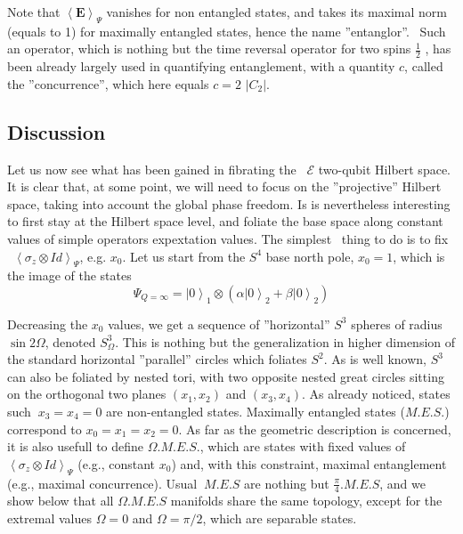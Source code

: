 \documentclass{amsart}
\begin{document}
Note that $\left\langle \mathbf{E}\right\rangle _{\Psi}$ vanishes for non
entangled states, and takes its maximal norm (equals to 1) for maximally
entangled states, hence the name ''entanglor''. \ Such an operator, which is
nothing but the time reversal operator for two spins
${\frac12}$%
, has been already largely used in quantifying entanglement\cite{wootters},
with a quantity $c$, called the ''concurrence'', which here equals $c=2$
$\left|  C_{2}\right|  $.

\subsection{Discussion}

Let us now see what has been gained in fibrating the \ $\mathcal{E}$ two-qubit
Hilbert space. It is clear that, at some point, we will need to focus on the
''projective'' Hilbert space, taking into account the global phase freedom. Is
is nevertheless interesting to first stay at the Hilbert space level, and
foliate the base space along constant values of simple operators expextation
values. The simplest \ thing to do is to fix \ $\left\langle \sigma_{z}\otimes
Id\right\rangle _{\Psi}$, e.g. $x_{0}$. Let us start from the $S^{4}$ base
north pole, $x_{0}=1$, which is the image of the states%
\begin{equation}
\Psi_{Q=\infty}=\left|  0\right\rangle _{1}\otimes\left(  \alpha\left|
0\right\rangle _{2}+\beta\left|  0\right\rangle _{2}\right)
\end{equation}

Decreasing the $x_{0}$ values, we get a sequence of ''horizontal'' $S^{3}$
spheres of radius $\sin2\Omega$, denoted $S_{\Omega}^{3}$. This is nothing but
the generalization in higher dimension of the standard horizontal ''parallel''
circles which foliates $S^{2}$. As is well known, $S^{3}$ can also be foliated
by nested tori, with two opposite nested great circles sitting on the
orthogonal two planes $\left(  x_{1},x_{2}\right)  $ and $\left(  x_{3}%
,x_{4}\right)  $. As already noticed, states such $\ x_{3}=x_{4}=0$ are
non-entangled states. Maximally entangled states ($M.E.S.$) correspond to
$x_{0}=x_{1}=x_{2}=0$. As far as the geometric description is concerned, it is
also usefull to define $\Omega.M.E.S.$, which are states with fixed values of
$\left\langle \sigma_{z}\otimes Id\right\rangle _{\Psi}$ (e.g., constant
$x_{0}$) and, with this constraint, maximal entanglement (e.g., maximal
concurrence). Usual $\ M.E.S$ are nothing but $\frac{\pi}{4}.M.E.S$, and we
show below that all $\Omega.M.E.S$ manifolds share the same topology, except
for the extremal values $\Omega=0$ and $\Omega=\pi/2$, which are separable states.
\end{document}
